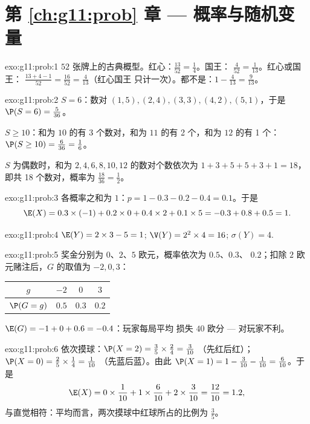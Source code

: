 \section*{第 \ref{ch:g11:prob} 章 --- 概率与随机变量}

\begin{solution}{exo:g11:prob:1}
$52$ 张牌上的古典概型。红心：$\frac{13}{52} = \frac14$。国王：
$\frac{4}{52} = \frac{1}{13}$。红心或国王：
$\frac{13 + 4 - 1}{52} = \frac{16}{52} = \frac{4}{13}$（红心国王
只计一次）。都不是：$1 - \frac{4}{13} = \frac{9}{13}$。
\end{solution}

\begin{solution}{exo:g11:prob:2}
$S = 6$：数对 $(1,5), (2,4), (3,3), (4,2), (5,1)$，于是
$\P(S = 6) = \frac{5}{36}$。

$S \geq 10$：和为 $10$ 的有 3 个数对，和为 $11$ 的有 2 个，和为 $12$ 的有 1 个：
$\P(S \geq 10) = \frac{6}{36} = \frac16$。

$S$ 为偶数时，和为 $2, 4, 6, 8, 10, 12$ 的数对个数依次为 $1 + 3 + 5 + 5 + 3 + 1 = 18$，
即共 18 个数对，概率为 $\frac{18}{36} = \frac12$。
\end{solution}

\begin{solution}{exo:g11:prob:3}
各概率之和为 $1$：$p = 1 - 0.3 - 0.2 - 0.4 = 0.1$。于是
\[
\E(X) = 0.3 \times (-1) + 0.2 \times 0 + 0.4 \times 2 + 0.1 \times 5
= -0.3 + 0.8 + 0.5 = 1 .
\]
\end{solution}

\begin{solution}{exo:g11:prob:4}
$\E(Y) = 2 \times 3 - 5 = 1$; $\V(Y) = 2^2 \times 4 = 16$;
$\sigma(Y) = 4$.
\end{solution}

\begin{solution}{exo:g11:prob:5}
奖金分别为 $0$、$2$、$5$ 欧元，概率依次为 $0.5$、$0.3$、
$0.2$；扣除 $2$ 欧元赌注后，$G$ 的取值为 $-2, 0, 3$：
\begin{center}
\begin{tabular}{c|ccc}
$g$ & $-2$ & $0$ & $3$\\
\hline
$\P(G=g)$ & $0.5$ & $0.3$ & $0.2$
\end{tabular}
\end{center}
$\E(G) = -1 + 0 + 0.6 = -0.4$：玩家每局平均
损失 $40$ 欧分 --- 对玩家不利。
\end{solution}

\begin{solution}{exo:g11:prob:6}
依次摸球：$\P(X = 2) = \frac35 \times \frac24 = \frac{3}{10}$
（先红后红）；$\P(X = 0) = \frac25 \times \frac14 = \frac{1}{10}$
（先蓝后蓝）。由此
$\P(X = 1) = 1 - \frac{3}{10} - \frac{1}{10} = \frac{6}{10}$。于是
\[
\E(X) = 0 \times \frac1{10} + 1 \times \frac6{10} + 2 \times \frac3{10}
= \frac{12}{10} = 1.2 ,
\]
与直觉相符：平均而言，两次摸球中红球所占的比例为 $\frac35$。
\end{solution}

